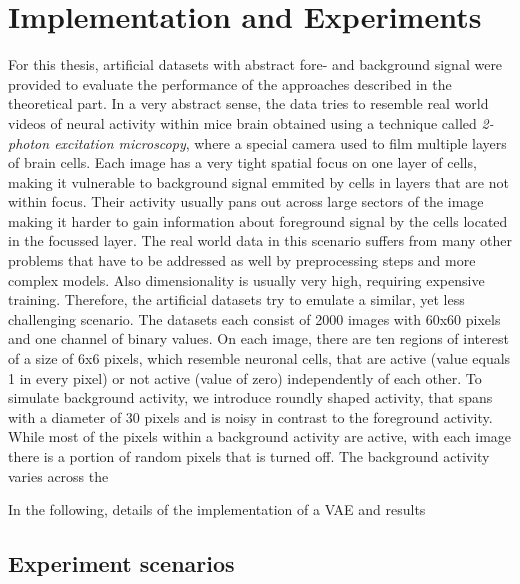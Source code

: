 \documentclass[12pt]{report}
\theoremstyle{definition}
\begin{document}




\chapter{Implementation and Experiments}
For this thesis, artificial datasets with abstract fore- and background signal were provided to evaluate the performance of the approaches described in the theoretical part. In a very abstract sense, the data tries to resemble real world videos of neural activity within mice brain obtained using a technique called \emph{2-photon excitation microscopy}, where a special camera used to film multiple layers of brain cells. Each image has a very tight spatial focus on one layer of cells, making it vulnerable to background signal emmited by cells in layers that are not within focus. Their activity usually pans out across large sectors of the image making it harder to gain information about foreground signal by the cells located in the focussed layer. The real world data in this scenario suffers from many other problems that have to be addressed as well by preprocessing steps and more complex models. Also dimensionality is usually very high, requiring expensive training. 
Therefore, the artificial datasets try to emulate a similar, yet less challenging scenario. The datasets each consist of 2000 images with 60x60 pixels and one channel of binary values. On each image, there are ten regions of interest of a size of 6x6 pixels, which resemble neuronal cells, that are active (value equals 1 in every pixel) or not active (value of zero) independently of each other. To simulate background activity, we introduce roundly shaped activity, that spans with a diameter of 30 pixels and is noisy in contrast to the foreground activity. While most of the pixels within a background activity are active, with each image there is a portion of random pixels that is turned off. The background activity varies across the 

In the following, details of the implementation of a VAE and results 

\section{Experiment scenarios}
 
\end{document}
